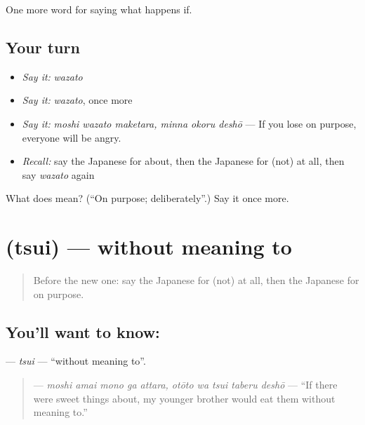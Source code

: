\begin{grammarlens}[title={What you've built}]
One more word for saying what happens if.
\end{grammarlens}

\subsection*{Your turn}
\begin{itemize}
\raggedright
  \item \emph{Say it:} \emph{wazato}
  \item \emph{Say it:} \emph{wazato}, once more
  \item \emph{Say it:} \emph{moshi wazato maketara, minna okoru deshō} — If you lose on purpose, everyone will be angry.
  \item \emph{Recall:} say the Japanese for about, then the Japanese for (not) at all, then say \emph{wazato} again
\end{itemize}

\begin{tcolorbox}[breakable,colback=teal!4,colframe=teal!35!black,title={Before you move on}]
What does  mean? (\textquotedblleft{}On purpose; deliberately\textquotedblright{}.) Say it once more.
\end{tcolorbox}
\section[\texorpdfstring{\ja{つい} (tsui)}{つい (tsui)}]{ (tsui) — without meaning to}

\label{lesson:JA-C531-tsui}



\begin{quote}
Before the new one: say the Japanese for (not) at all, then the Japanese for on purpose.
\end{quote}

\subsection*{You'll want to know: }
\textbf{} — \emph{tsui} — \textquotedblleft{}without meaning to\textquotedblright{}.

\begin{quote}
\textbf{     } — \emph{moshi amai mono ga attara, otōto wa tsui taberu deshō} — \textquotedblleft{}If there were sweet things about, my younger brother would eat them without meaning to.\textquotedblright{}
\end{quote}

